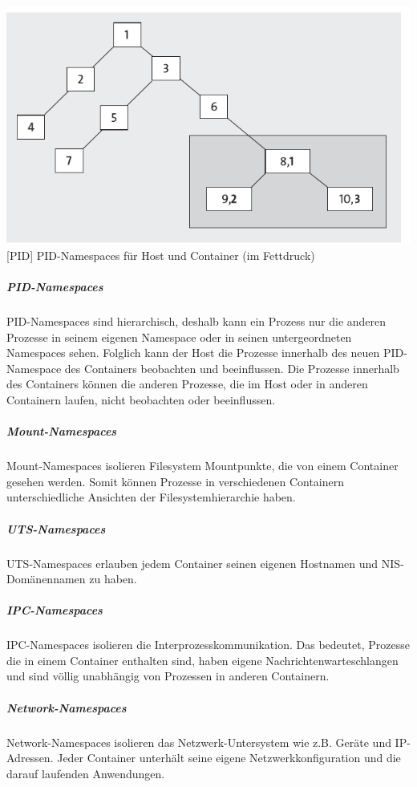 \vspace{1em}
\begin{minipage}{\linewidth}
	\centering
	\includegraphics[width=1\linewidth]{pics/PID.PNG}
	[PID]{ PID-Namespaces für Host und Container (im Fettdruck) \cite{Liebel2017SkalierbareContainer-Infrastrukturen}}
	\label{fig:PID}
\end{minipage}

\subparagraph{PID-Namespaces} PID-Namespaces sind hierarchisch, deshalb kann ein Prozess nur die anderen Prozesse in seinem eigenen Namespace oder in seinen untergeordneten Namespaces sehen. Folglich kann der Host die Prozesse innerhalb des neuen PID-Namespace des Containers beobachten und beeinflussen. Die Prozesse innerhalb des Containers können die anderen Prozesse, die im Host oder in anderen Containern laufen, nicht beobachten oder beeinflussen.

\subparagraph{Mount-Namespaces} Mount-Namespaces isolieren Filesystem Mountpunkte, die von einem Container gesehen werden. Somit können Prozesse in verschiedenen Containern unterschiedliche Ansichten der Filesystemhierarchie haben.

\subparagraph{UTS-Namespaces} UTS-Namespaces erlauben jedem Container seinen eigenen Hostnamen und NIS-Domänennamen zu haben.

\subparagraph{IPC-Namespaces} IPC-Namespaces isolieren die Interprozesskommunikation. Das bedeutet, Prozesse die in einem Container enthalten sind, haben eigene Nachrichtenwarteschlangen und sind völlig unabhängig von Prozessen in anderen Containern.

\subparagraph{Network-Namespaces} Network-Namespaces isolieren das Netzwerk-Untersystem wie z.B. Geräte und IP-Adressen. Jeder Container unterhält seine eigene Netzwerkkonfiguration und die darauf laufenden Anwendungen.

